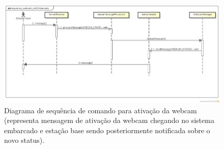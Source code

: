 \begin{figure}[H]
  \centering
  \includegraphics[width=\textwidth, keepaspectratio]{./figuras/sistEmbarcado/sequence_webcam_sistEmbarcado.png}
  \caption{Diagrama de sequência de comando para ativação da webcam (representa mensagem de ativação da webcam chegando no sistema embarcado e estação base sendo posteriormente notificada sobre o novo status).}
  \label{fig:diagrama_sequencia_webcam_sist_embarcado}
\end{figure}



